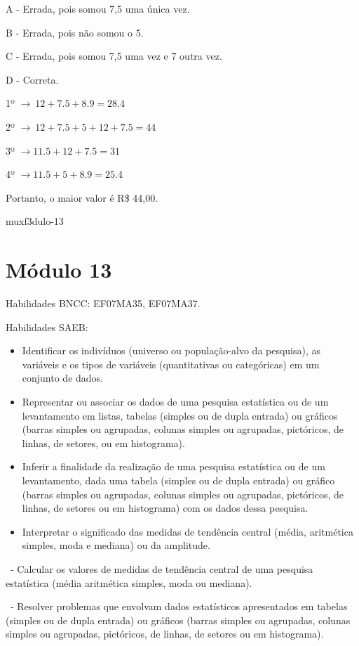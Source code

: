 {A - Errada, pois somou 7,5 uma única vez.

B - Errada, pois não somou o 5.

C - Errada, pois somou 7,5 uma vez e 7 outra vez.

D - Correta.

1º \(\rightarrow \ 12 + 7.5 + 8.9 = 28.4\)

2º \(\rightarrow \ 12 + 7.5 + 5 + 12 + 7.5 = 44\)

3º \(\rightarrow 11.5 + 12 + 7.5 = 31\)

4º \(\rightarrow 11.5 + 5 + 8.9 = 25.4\)

Portanto, o maior valor é R\$ 44,00.

muxf3dulo-13}{%
\section{Módulo 13}

Habilidades BNCC: EF07MA35, EF07MA37.

Habilidades SAEB:

\begin{itemize}
\item
  Identificar os indivíduos (universo ou população-alvo da pesquisa), as
  variáveis e os tipos de variáveis (quantitativas ou categóricas) em um
  conjunto de dados.
\item
  Representar ou associar os dados de uma pesquisa estatística ou de um
  levantamento em listas, tabelas (simples ou de dupla entrada) ou
  gráficos (barras simples ou agrupadas, colunas simples ou agrupadas,
  pictóricos, de linhas, de setores, ou em histograma).
\item
  Inferir a finalidade da realização de uma pesquisa estatística ou de
  um levantamento, dada uma tabela (simples ou de dupla entrada) ou
  gráfico (barras simples ou agrupadas, colunas simples ou agrupadas,
  pictóricos, de linhas, de setores ou em histograma) com os dados dessa
  pesquisa.~
\item
  Interpretar o significado das medidas de tendência central (média,
  aritmética simples, moda e mediana) ou da amplitude.
\end{itemize}

~- Calcular os valores de medidas de tendência central de uma pesquisa
estatística (média aritmética simples, moda ou mediana).

~- Resolver problemas que envolvam dados estatísticos apresentados em
tabelas (simples ou de dupla entrada) ou gráficos (barras simples ou
agrupadas, colunas simples ou agrupadas, pictóricos, de linhas, de
setores ou em histograma).

}
